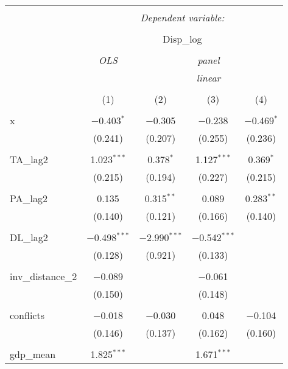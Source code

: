 
\begin{table}[!htbp] \centering 
  \caption{} 
  \label{} 
\begin{tabular}{@{\extracolsep{5pt}}lcccc} 
\\[-1.8ex]\hline 
\hline \\[-1.8ex] 
 & \multicolumn{4}{c}{\textit{Dependent variable:}} \\ 
\cline{2-5} 
\\[-1.8ex] & \multicolumn{4}{c}{Disp\_log} \\ 
\\[-1.8ex] & \textit{OLS} & \multicolumn{3}{c}{\textit{panel}} \\ 
 & \textit{} & \multicolumn{3}{c}{\textit{linear}} \\ 
\\[-1.8ex] & (1) & (2) & (3) & (4)\\ 
\hline \\[-1.8ex] 
 x & $-$0.403$^{*}$ & $-$0.305 & $-$0.238 & $-$0.469$^{*}$ \\ 
  & (0.241) & (0.207) & (0.255) & (0.236) \\ 
  & & & & \\ 
 TA\_lag2 & 1.023$^{***}$ & 0.378$^{*}$ & 1.127$^{***}$ & 0.369$^{*}$ \\ 
  & (0.215) & (0.194) & (0.227) & (0.215) \\ 
  & & & & \\ 
 PA\_lag2 & 0.135 & 0.315$^{**}$ & 0.089 & 0.283$^{**}$ \\ 
  & (0.140) & (0.121) & (0.166) & (0.140) \\ 
  & & & & \\ 
 DL\_lag2 & $-$0.498$^{***}$ & $-$2.990$^{***}$ & $-$0.542$^{***}$ &  \\ 
  & (0.128) & (0.921) & (0.133) &  \\ 
  & & & & \\ 
 inv\_distance\_2 & $-$0.089 &  & $-$0.061 &  \\ 
  & (0.150) &  & (0.148) &  \\ 
  & & & & \\ 
 conflicts & $-$0.018 & $-$0.030 & 0.048 & $-$0.104 \\ 
  & (0.146) & (0.137) & (0.162) & (0.160) \\ 
  & & & & \\ 
 gdp\_mean & 1.825$^{***}$ &  & 1.671$^{***}$ &  \\ 

\end{tabular}
\end{table}
